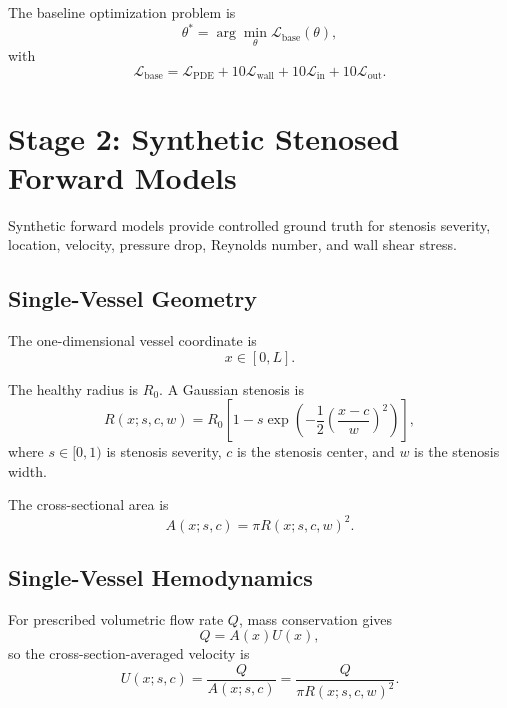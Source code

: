 \documentclass[11pt]{article}
\begin{document}
The baseline optimization problem is
\begin{equation}
    \theta^{\ast}
    =
    \arg\min_{\theta}
    \mathcal{L}_{\mathrm{base}}(\theta),
\end{equation}
with
\begin{equation}
    \mathcal{L}_{\mathrm{base}}
    =
    \mathcal{L}_{\mathrm{PDE}}
    +
    10\mathcal{L}_{\mathrm{wall}}
    +
    10\mathcal{L}_{\mathrm{in}}
    +
    10\mathcal{L}_{\mathrm{out}}.
\end{equation}

\section{Stage 2: Synthetic Stenosed Forward Models}

Synthetic forward models provide controlled ground truth for stenosis severity, location, velocity, pressure drop, Reynolds number, and wall shear stress.

\subsection{Single-Vessel Geometry}

The one-dimensional vessel coordinate is
\begin{equation}
    x\in[0,L].
\end{equation}

The healthy radius is $R_0$. A Gaussian stenosis is
\begin{equation}
    R(x;s,c,w)
    =
    R_0
    \left[
        1
        -
        s
        \exp
        \left(
            -\frac{1}{2}
            \left(
                \frac{x-c}{w}
            \right)^2
        \right)
    \right],
    \label{eq:single_radius}
\end{equation}
where $s\in[0,1)$ is stenosis severity, $c$ is the stenosis center, and $w$ is the stenosis width.

The cross-sectional area is
\begin{equation}
    A(x;s,c)
    =
    \pi R(x;s,c,w)^2.
\end{equation}

\subsection{Single-Vessel Hemodynamics}

For prescribed volumetric flow rate $Q$, mass conservation gives
\begin{equation}
    Q = A(x)U(x),
\end{equation}
so the cross-section-averaged velocity is
\begin{equation}
    U(x;s,c)
    =
    \frac{Q}{A(x;s,c)}
    =
    \frac{Q}{\pi R(x;s,c,w)^2}.
\end{equation}
\end{document}
